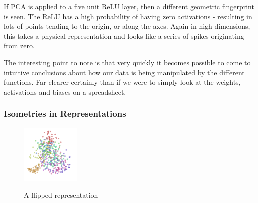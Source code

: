 \documentclass[a4paper,11pt,titlepage]{article}
\begin{document}
		If PCA is applied to a five unit ReLU layer, then a different geometric fingerprint is seen. The ReLU has a high probability of having zero activations - resulting in lots of points tending to the origin, or along the axes. Again in high-dimensions, this takes a physical representation and looks like a series of spikes originating from zero. 		
		\par 
		The interesting point to note is that very quickly it becomes possible to come to intuitive conclusions about how our data is being manipulated by the different functions. Far clearer certainly than if we were to simply look at the weights, activations and biases on a spreadsheet. 
		\par 
		
		\subsubsection{Isometries in Representations}
		
		\begin{figure}[H]
    			\qquad
    			{{\includegraphics[width=0.25\textwidth]
    				{img/colah_flip.png} 
    			}}%
    			\caption{A flipped representation}%
		\end{figure}
		
\end{document}
